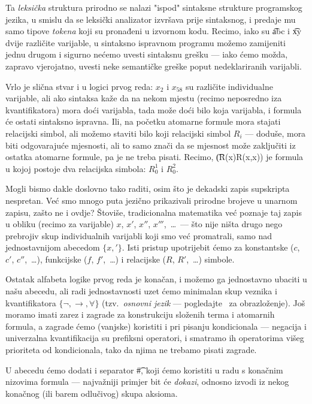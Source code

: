 Ta \emph{leksička} struktura prirodno se nalazi "ispod" sintaksne strukture programskog jezika, u smislu da se leksički analizator izvršava prije sintaksnog, i predaje mu samo tipove \emph{tokena} koji su pronađeni u izvornom kodu. Recimo, iako su \t{abc} i \t{xy} dvije različite varijable, u sintaksno ispravnom programu možemo zamijeniti jednu drugom i sigurno nećemo uvesti sintaksnu grešku --- iako ćemo možda, zapravo vjerojatno, uvesti neke semantičke greške poput nedeklariranih varijabli.

Vrlo je slična stvar i u logici prvog reda: $x_2$ i $x_{58}$ su različite individualne varijable, ali ako sintaksa kaže da na nekom mjestu (recimo neposredno iza kvantifikatora) mora doći varijabla, tada može doći bilo koja varijabla, i formula će ostati sintaksno ispravna. Ili, na početku atomarne formule mora stajati relacijski simbol, ali možemo staviti bilo koji relacijski simbol $R_i$ --- doduše, mora biti odgovarajuće mjesnosti, ali to samo znači da se mjesnost može zaključiti iz ostatka atomarne formule, pa je ne treba pisati. Recimo, \t{(R(x)\textrightarrow R(x,x))} je formula u kojoj postoje dva relacijska simbola: $R_0^1$ i $R_0^2$.

Mogli bismo dakle doslovno tako raditi, osim što je dekadski zapis supskripta nespretan. Već smo mnogo puta jezično prikazivali prirodne brojeve u unarnom zapisu, zašto ne i ovdje? Štoviše, tradicionalna matematika već poznaje taj zapis u obliku (recimo za varijable) $x$, $x'$, $x''$, $x'''$,~\ldots\ --- što nije ništa drugo nego prebrojiv skup individualnih varijabli koji smo već promatrali, samo nad jednostavnijom abecedom $\{x,'\!\}$. Isti pristup upotrijebit ćemo za konstantske ($c$, $c'$, $c''$,~\ldots), funkcijske ($f$, $f'$,~\ldots) i relacijske ($R$, $R'$,~\ldots) simbole.

Ostatak alfabeta logike prvog reda je konačan, i možemo ga jednostavno ubaciti u našu abecedu, ali radi jednostavnosti uzet ćemo minimalan skup veznika i kvantifikatora $\{\lnot,\to,\forall\}$ (tzv.\ \emph{osnovni jezik} --- pogledajte~\cite[str.\ 124]{skr:VukML} za obrazloženje). Još moramo imati zarez i zagrade za konstrukciju složenih terma i atomarnih formula, a zagrade ćemo (vanjske) koristiti i pri pisanju kondicionala --- negacija i univerzalna kvantifikacija su prefiksni operatori, i smatramo ih operatorima višeg prioriteta od kondicionala, tako da njima ne trebamo pisati zagrade.

U abecedu ćemo dodati i separator \t\#, koji ćemo koristiti u radu s konačnim nizovima formula --- najvažniji primjer bit će \emph{dokazi}, odnosno izvodi iz nekog konačnog (ili barem odlučivog) skupa aksioma.

